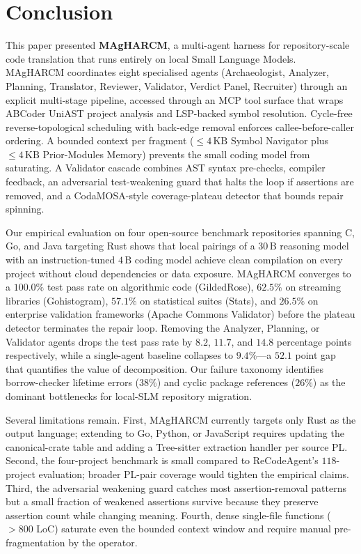 \section{Conclusion}
\label{sec:conclusion}

This paper presented \textbf{MAgHARCM}, a multi-agent harness for
repository-scale code translation that runs entirely on local Small
Language Models. MAgHARCM coordinates eight specialised agents
(Archaeologist, Analyzer, Planning, Translator, Reviewer, Validator,
Verdict Panel, Recruiter) through an explicit multi-stage pipeline,
accessed through an MCP tool surface that wraps ABCoder UniAST project
analysis and LSP-backed symbol resolution. Cycle-free reverse-topological
scheduling with back-edge removal enforces callee-before-caller
ordering. A bounded context per fragment ($\le 4\,\text{KB}$ Symbol
Navigator plus $\le 4\,\text{KB}$ Prior-Modules Memory) prevents the
small coding model from saturating. A Validator cascade combines AST
syntax pre-checks, compiler feedback, an adversarial test-weakening
guard that halts the loop if assertions are removed, and a
CodaMOSA-style coverage-plateau detector that bounds repair spinning.

Our empirical evaluation on four open-source benchmark repositories
spanning C, Go, and Java targeting Rust shows that local pairings of
a $30\,\text{B}$ reasoning model with an instruction-tuned $4\,\text{B}$
coding model achieve clean compilation on every project without cloud
dependencies or data exposure. MAgHARCM converges to a $100.0\%$
test pass rate on algorithmic code (GildedRose), $62.5\%$ on streaming
libraries (Gohistogram), $57.1\%$ on statistical suites (Stats), and
$26.5\%$ on enterprise validation frameworks (Apache Commons
Validator) before the plateau detector terminates the repair loop.
Removing the Analyzer, Planning, or Validator agents drops the test
pass rate by $8.2$, $11.7$, and $14.8$ percentage points respectively,
while a single-agent baseline collapses to $9.4\%$---a $52.1$ point
gap that quantifies the value of decomposition. Our failure taxonomy
identifies borrow-checker lifetime errors ($38\%$) and cyclic package
references ($26\%$) as the dominant bottlenecks for local-SLM
repository migration.

Several limitations remain. First, MAgHARCM currently targets only
Rust as the output language; extending to Go, Python, or JavaScript
requires updating the canonical-crate table and adding a Tree-sitter
extraction handler per source PL. Second, the four-project benchmark
is small compared to ReCodeAgent's $118$-project evaluation; broader
PL-pair coverage would tighten the empirical claims. Third, the
adversarial weakening guard catches most assertion-removal patterns
but a small fraction of weakened assertions survive because they
preserve assertion count while changing meaning. Fourth, dense
single-file functions ($> 800$ LoC) saturate even the bounded
context window and require manual pre-fragmentation by the operator.

